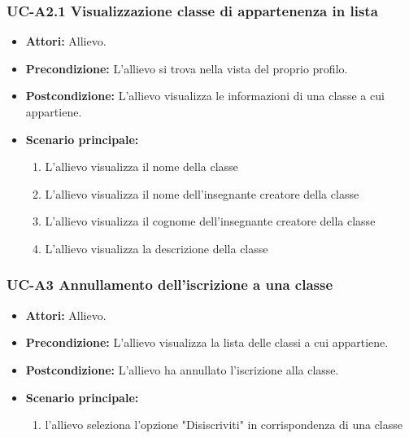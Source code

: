 \subsubsection{UC-A2.1 Visualizzazione classe di appartenenza in lista}
		\begin{itemize}
			\item \textbf{Attori:} Allievo.
			\item \textbf{Precondizione:} L'allievo si trova nella vista del proprio profilo.
			\item \textbf{Postcondizione:} L'allievo visualizza le informazioni di una classe a cui appartiene.
			\item \textbf{Scenario principale:}
			\begin{enumerate}
				\item L'allievo visualizza il nome della classe
				\item L'allievo visualizza il nome dell'insegnante creatore della classe
				\item L'allievo visualizza il cognome dell'insegnante creatore della classe
				\item L'allievo visualizza la descrizione della classe
			\end{enumerate}
		\end{itemize}	

	\subsubsection{UC-A3 Annullamento dell'iscrizione a una classe}
		\begin{itemize}
			\item \textbf{Attori:} Allievo.
			\item \textbf{Precondizione:} L'allievo visualizza la lista delle classi a cui appartiene.
			\item \textbf{Postcondizione:} L'allievo ha annullato l'iscrizione alla classe.
			\item \textbf{Scenario principale:}
			\begin{enumerate}
				\item l'allievo seleziona l'opzione "Disiscriviti" in corrispondenza di una classe
			\end{enumerate}
		\end{itemize}					
				
